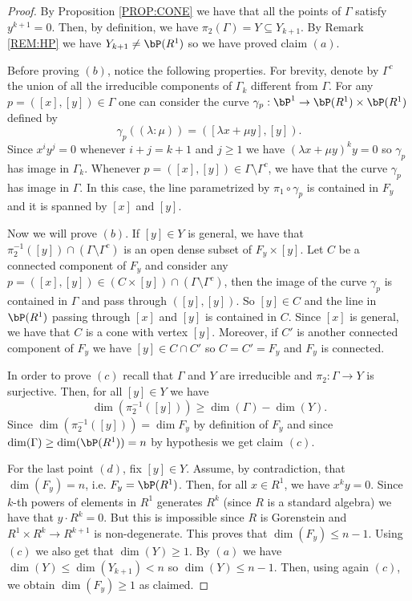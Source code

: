 \documentclass[a4paper,11pt]{amsart}
\begin{document}
\begin{proof}
By Proposition \ref{PROP:CONE} we have that all the points of $\Gamma$ satisfy $y^{k+1}=0$. Then, by definition, we have $\pi_2(\Gamma)=Y\subseteq Y_{k+1}$. By Remark \ref{REM:HP} we have $Y_{k+1}\neq \bP(R^1)$ so we have proved claim $(a)$.
\vspace{2mm}

Before proving $(b)$, notice the following properties. For brevity, denote by $\Gamma^c$ the union of all the irreducible components of $\Gamma_k$ different from $\Gamma$. 
For any $p=([x],[y])\in \Gamma$ one can consider the curve $\gamma_p:\bP^1\to \bP(R^1)\times \bP(R^1)$ defined by 
$$\gamma_p((\lambda:\mu))=([\lambda x+\mu y], [y]).$$
Since $x^iy^j=0$ whenever $i+j=k+1$ and $j\geq 1$ we have $(\lambda x+\mu y)^ky=0$ so $\gamma_p$ has image in $\Gamma_k$. Whenever $p=([x],[y])\in \Gamma\setminus \Gamma^c$, we have that the curve $\gamma_p$ has image in $\Gamma$. In this case, the line parametrized by $\pi_1\circ\gamma_p$ is contained in $F_y$ and it is spanned by $[x]$ and $[y]$.
\vspace{2mm}

Now we will prove $(b)$. If $[y]\in Y$ is general, we have that $\pi_2^{-1}([y])\cap (\Gamma\setminus \Gamma^c)$ is an open dense subset of $F_y\times [y]$. Let $C$ be a connected component of $F_y$ and consider any $p=([x],[y])\in (C\times [y])\cap (\Gamma\setminus \Gamma^c)$, then the image of the curve $\gamma_p$ is contained in $\Gamma$ and pass through $([y],[y])$. So $[y]\in C$ and the line in $\bP(R^1)$ passing through $[x]$ and $[y]$ is contained in $C$. Since $[x]$ is general, we have that $C$ is a cone with vertex $[y]$. Moreover, if $C'$ is another connected component of $F_y$ we have $[y]\in C\cap C'$ so $C=C'=F_y$ and $F_y$ is connected.
\vspace{2mm}

In order to prove $(c)$ recall that $\Gamma$ and $Y$ are irreducible and $\pi_2:\Gamma\to Y$ is surjective. Then, for all $[y]\in Y$ we have
$$\dim(\pi_2^{-1}([y]))\geq \dim(\Gamma)-\dim(Y).$$
Since $\dim(\pi_2^{-1}([y]))=\dim F_y$ by definition of $F_y$ and since $\dim(\Gamma)\geq \dim(\bP(R^1))=n$ by hypothesis we get claim $(c)$.
\vspace{2mm}

For the last point $(d)$, fix $[y]\in Y$. Assume, by contradiction, that $\dim(F_y)=n$, i.e. $F_y=\bP(R^1)$. Then, for all $x\in R^1$, we have $x^ky=0$. Since $k$-th powers of elements in $R^1$ generates $R^k$ (since $R$ is a standard algebra) we have that $y\cdot R^k=0$. But this is impossible since $R$ is Gorenstein and $R^1\times R^k\to R^{k+1}$ is non-degenerate. This proves that $\dim(F_y)\leq n-1$. Using $(c)$ we also get that $\dim(Y)\geq 1$. By $(a)$ we have $\dim(Y)\leq \dim(Y_{k+1})<n$ so $\dim(Y)\leq n-1$. Then, using again $(c)$, we obtain $\dim(F_y)\geq 1$ as claimed. 
\end{proof}
\end{document}
